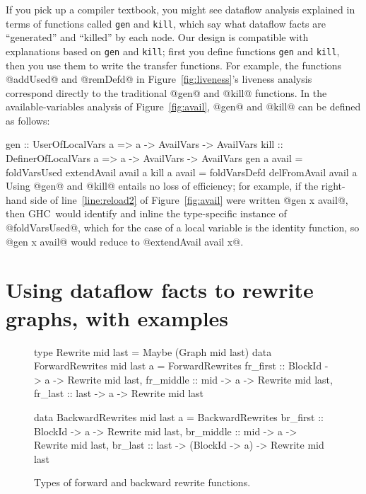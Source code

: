 \documentclass[blockstyle,preprint,natbib,nocopyrightspace]{sigplanconf}
\newenvironment{smallcode}{\par\unskip\small\verbatim}{\endverbatim}
\newcommand\lineref[1]{line~\ref{line:#1}}
\newcommand\seclabel[1]{\label{sec:#1}}
\newcommand\figref[1]{Figure~\ref{fig:#1}}
\newcommand\figlabel[1]{\label{fig:#1}}
\begin{document}
If you pick up a compiler textbook, you might see dataflow
analysis explained in terms of functions called \texttt{gen} and
\texttt{kill}, 
which say what dataflow facts are ``generated'' and
``killed'' by each node.
Our design is compatible with explanations based on \texttt{gen} and
\texttt{kill};
first you define functions \texttt{gen} and \texttt{kill}, then you
use them to write the transfer functions.
For example, the functions @addUsed@ and @remDefd@ in \figref{liveness}'s
liveness analysis correspond directly to the traditional @gen@ and
@kill@ functions.
In the available-variables analysis of \figref{avail}, @gen@ and
@kill@ can be defined as follows:
\begin{smallcode}
gen  :: UserOfLocalVars    a => a -> AvailVars -> AvailVars
kill :: DefinerOfLocalVars a => a -> AvailVars -> AvailVars
gen  a avail = foldVarsUsed extendAvail  avail a
kill a avail = foldVarsDefd delFromAvail avail a
\end{smallcode}
Using @gen@ and @kill@ entails no loss of efficiency;
for example, if the right-hand side of \lineref{reload2} of \figref{avail}
were written
@gen x avail@,
then GHC~would 
identify and %
inline the type-specific instance of @foldVarsUsed@, which for 
\ifpagetuning\else the case of \fi
a local variable is the identity function, so @gen x avail@
would reduce to @extendAvail avail x@.
\fi

\section{Using dataflow facts to rewrite graphs\ifpagetuning\else, with examples\fi}

\seclabel{rewrites}

\seclabel{example-rewrites}

\begin{figure}
\begin{code}
type Rewrite mid last = Maybe (Graph mid last)
data ForwardRewrites mid last a = ForwardRewrites
 {fr_first  :: BlockId -> a -> Rewrite mid last,
  fr_middle :: mid     -> a -> Rewrite mid last,
  fr_last   :: last    -> a -> Rewrite mid last} 

data BackwardRewrites mid last a = BackwardRewrites
 {br_first  :: BlockId  -> a  -> Rewrite mid last,
  br_middle :: mid      -> a  -> Rewrite mid last,
  br_last   :: last ->
               (BlockId -> a) -> Rewrite mid last} 
\end{code}
\caption{Types of forward and backward rewrite functions.}
\figlabel{rewrites}
\end{figure}
\end{document}

